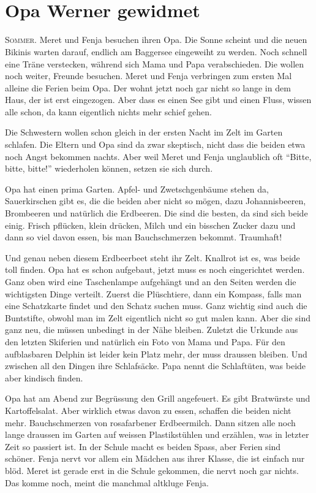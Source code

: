 \chapter*{{}\\\small \color{red} Opa Werner gewidmet}
\lettrine[lines=3]{\color{red}S}{ommer.} Meret und Fenja besuchen ihren Opa. Die Sonne scheint und die neuen Bikinis warten darauf, endlich am Baggersee eingeweiht zu werden. Noch schnell eine Träne verstecken, während sich Mama und Papa verabschieden. Die wollen noch weiter, Freunde besuchen. Meret und Fenja verbringen zum ersten Mal alleine die Ferien beim Opa. Der wohnt jetzt noch gar nicht so lange in dem Haus, der ist erst eingezogen. Aber dass es einen See gibt und einen Fluss, wissen alle schon, da kann eigentlich nichts mehr schief gehen.

Die Schwestern wollen schon gleich in der ersten Nacht im Zelt im Garten schlafen. Die Eltern und Opa sind da zwar skeptisch, nicht dass die beiden etwa noch Angst bekommen nachts. Aber weil Meret und Fenja unglaublich oft \enquote{Bitte, bitte, bitte!} wiederholen können, setzen sie sich durch.

Opa hat einen prima Garten. Apfel- und Zwetschgenbäume stehen da, Sauerkirschen gibt es, die die beiden aber nicht so mögen, dazu Johannisbeeren, Brombeeren und natürlich die Erdbeeren. Die sind die besten, da sind sich beide einig. Frisch pflücken, klein drücken, Milch und ein bisschen Zucker dazu und dann so viel davon essen, bis man Bauchschmerzen bekommt. Traumhaft!

Und genau neben diesem Erdbeerbeet steht ihr Zelt. Knallrot ist es, was beide toll finden. Opa hat es schon aufgebaut, jetzt muss es noch eingerichtet werden. Ganz oben wird eine Taschenlampe aufgehängt und an den Seiten werden die wichtigsten Dinge verteilt. Zuerst die Plüschtiere, dann ein Kompass, falls man eine Schatzkarte findet und den Schatz suchen muss. Ganz wichtig sind auch die Buntstifte, obwohl man im Zelt eigentlich nicht so gut malen kann. Aber die sind ganz neu, die müssen unbedingt in der Nähe bleiben. Zuletzt die Urkunde aus den letzten Skiferien und natürlich ein Foto von Mama und Papa. Für den aufblasbaren Delphin ist leider kein Platz mehr, der muss draussen bleiben. Und zwischen all den Dingen ihre Schlafsäcke. Papa nennt die Schlaftüten, was beide aber kindisch finden.

Opa hat am Abend zur Begrüssung den Grill angefeuert. Es gibt Bratwürste und Kartoffelsalat. Aber wirklich etwas davon zu essen, schaffen die beiden nicht mehr. Bauchschmerzen von rosafarbener Erdbeermilch. Dann sitzen alle noch lange draussen im Garten auf weissen Plastikstühlen und erzählen, was in letzter Zeit so passiert ist. In der Schule macht es beiden Spass, aber Ferien sind schöner. Fenja nervt vor allem ein Mädchen aus ihrer Klasse, die ist einfach nur blöd. Meret ist gerade erst in die Schule gekommen, die nervt noch gar nichts. Das komme noch, meint die manchmal altkluge Fenja.

